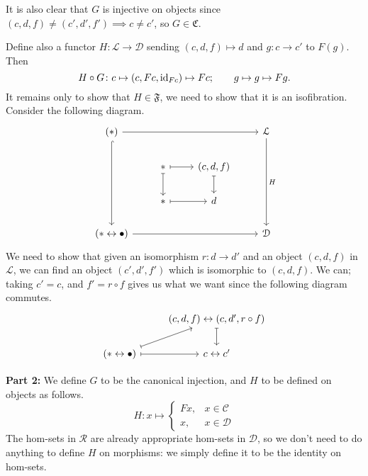 \documentclass[main.tex]{subfiles}
\begin{document}
It is also clear that $G$ is injective on objects since $(c, d, f) \neq (c', d', f') \implies c \neq c'$, so $G \in \mathfrak{C}$.

Define also a functor $H\colon \mathcal{L} \to \mathcal{D}$ sending $(c, d, f) \mapsto d$ and $g\colon c \to c'$ to $F(g)$. Then
\begin{equation*}
  H \circ G\colon c \mapsto (c, Fc, \mathrm{id}_{Fc}) \mapsto Fc;\qquad g \mapsto g \mapsto Fg.
\end{equation*}
It remains only to show that $H \in \mathfrak{F}$, we need to show that it is an isofibration. Consider the following diagram.
\begin{equation*}
  \begin{tikzcd}
    (*)
    \arrow[ddd, swap, hookrightarrow]
    \arrow[rrr]
    &&& \mathcal{L}
    \arrow[ddd, "H"]
    \\
    & *
    \arrow[r, mapsto]
    \arrow[d, mapsto]
    & (c, d, f)
    \arrow[d, mapsto]
    \\
    & *
    \arrow[r, mapsto]
    & d
    \\
    (* \leftrightarrow \bullet)
    \arrow[rrr]
    &&& \mathcal{D}
  \end{tikzcd}
\end{equation*}
We need to show that given an isomorphism $r\colon d \to d'$ and an object $(c, d, f)$ in $\mathcal{L}$, we can find an object $(c', d', f')$ which is isomorphic to $(c, d, f)$. We can; taking $c' = c$, and $f' = r \circ f$ gives us what we want since the following diagram commutes.
\begin{equation*}
  \begin{tikzcd}
    & (c, d, f) \leftrightarrow (c, d', r \circ f)
    \arrow[d, mapsto]
    \\
    (* \leftrightarrow \bullet)
    \arrow[ur, mapsto]
    \arrow[r, mapsto]
    & c \leftrightarrow c'
  \end{tikzcd}
\end{equation*}

\textbf{Part 2:}
We define $G$ to be the canonical injection, and $H$ to be defined on objects as follows.
\begin{equation*}
  H\colon x \mapsto
  \begin{cases}
    Fx, &x \in \mathcal{C} \\
    x, &x \in \mathcal{D}
  \end{cases}
\end{equation*}
The hom-sets in $\mathcal{R}$ are already appropriate hom-sets in $\mathcal{D}$, so we don't need to do anything to define $H$ on morphisms: we simply define it to be the identity on hom-sets.
\end{document}
